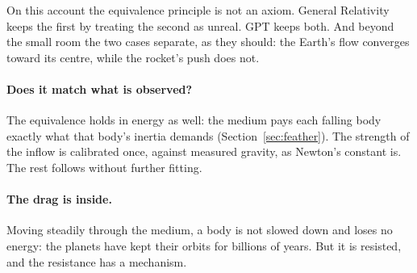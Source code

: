 \documentclass[11pt,a4paper]{article}
\begin{document}
On this account the equivalence principle is not an axiom.  General Relativity keeps the first by treating the second as unreal. GPT keeps both. And beyond the small room the two cases separate, as they should: the Earth's flow converges toward its centre, while the rocket's push does not.

\paragraph{Does it match what is observed?}  The equivalence holds in energy as well: the medium pays each falling body exactly what that body's inertia demands (Section~\ref{sec:feather}). The strength of the inflow is calibrated once, against measured gravity, as Newton's constant is. The rest follows without further fitting.

\paragraph{The drag is inside.} Moving steadily through the medium, a body is not slowed down and loses no energy: the planets have kept their orbits for billions of years. But it is resisted, and the resistance has a mechanism. 
\end{document}
